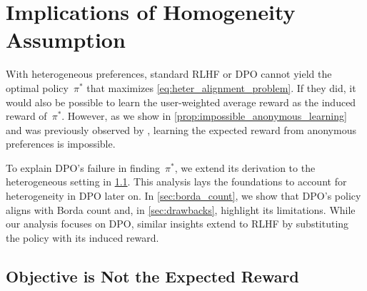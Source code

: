 \section{Implications of Homogeneity Assumption}
\label{sec:dpo_with_unknown_u}

With heterogeneous preferences, standard RLHF or DPO cannot yield the optimal policy~$\pi^*$ that maximizes \cref{eq:heter_alignment_problem}. If they did, it would also be possible to learn the user-weighted average reward as the induced reward of~$\pi^*$. However, as we show in \cref{prop:impossible_anonymous_learning} and was previously observed
by \citet{siththaranjan2023distributional,procaccia2025clone}, learning the expected reward from anonymous preferences is impossible.

To explain DPO's failure in finding~$\pi^*$, we extend its derivation to the heterogeneous setting in \cref{sec:dpo_deos_not}. This analysis lays the foundations to account for heterogeneity in DPO later on.
%
In \cref{sec:borda_count}, we show that DPO's policy aligns with Borda count and, in \cref{sec:drawbacks}, highlight its limitations. While our analysis focuses on DPO, similar insights extend to RLHF by substituting the policy with its induced reward.


\subsection{Objective is Not the Expected Reward}
\label{sec:dpo_deos_not}

